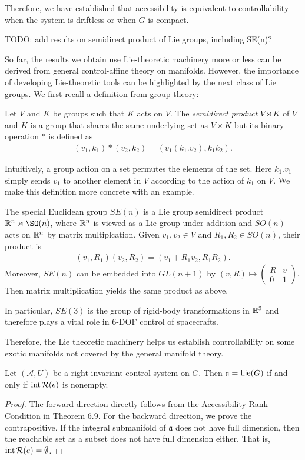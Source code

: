 \documentclass[12pt,class=article,crop=false]{standalone}
\begin{document}
Therefore, we have established that accessibility is equivalent to controllability when the system is driftless or when $ G$ is compact.



TODO: add results on semidirect product of Lie groups, including SE(n)?

So far, the results we obtain use Lie-theoretic machinery more or less can be derived from general control-affine theory on manifolds. However, the importance of developing Lie-theoretic tools can be highlighted by the next class of Lie groups. We first recall a definition from group theory:
\begin{defn}
Let $ V$ and  $ K$ be groups such that $ K$ acts on $ V$. The  \emph{semidirect product} $ V \rtimes K$ of $ V$ and  $ K$ is a group that shares the same underlying set as $ V \times K$ but its binary operation $ *$ is defined as
\begin{align*}
	(v_1,k_1) * (v_2,k_2) = (v_1 (k_1.v_2), k_1 k_2). 
\end{align*}
\end{defn}
Intuitively, a group action on a set permutes the elements of the set. Here $ k_1.v_1$ simply sends $ v_1$ to another element in $ V$ according to the action of  $ k_1$ on $ V$. We make this definition more concrete with an example.
\begin{example}
The special Euclidean group $ SE(n)$ is a Lie group semidirect product  $ \rr^{n} \rtimes \SO(n)$, where $ \mathbb{R}^{n}$ is viewed as a Lie group under addition and $ SO(n)$ acts on  $ \mathbb{R}^{n}$ by matrix multiplcation. Given $ v_1, v_2 \in V$ and $ R_1, R_2 \in SO(n)$, their product is
\begin{align*}
	(v_1, R_1)(v_2,R_2) = (v_1+ R_1v_2, R_1 R_2).
\end{align*}
Moreover, $ SE(n)$ can be embedded into  $ GL(n+1)$ by $ (v,R) \mapsto \begin{pmatrix} R & v\\ 0 &1 \end{pmatrix} $. Then matrix multiplication yields the same product as above.

In particular, $ SE(3)$ is the group of rigid-body transformations  in $ \mathbb{R}^{3}$ and therefore plays a vital role in 6-DOF control of spacecrafts.
\end{example}
Therefore, the Lie theoretic machinery helps us establish controllability on some exotic manifolds not covered by the general manifold theory.

\begin{lemma}
Let $ (\mathcal{A},U)$ be a right-invariant control system on $G$. Then $ \mathfrak{a} = \mathsf{Lie}( G)$ if and only if $ \operatorname{int} \mathcal{R}( e) $ is nonempty.
\end{lemma}
\begin{proof}
The forward direction directly follows from the Accessibility Rank Condition in Theorem 6.9. For the backward direction, we prove the contrapositive. If the integral submanifold of $ \mathfrak{a} $ does not have full dimension, then the reachable set as a subset does not have full dimension either. That is,  $ \operatorname{int} \mathcal{R}( e) = \emptyset $.
\end{proof}
\end{document}
